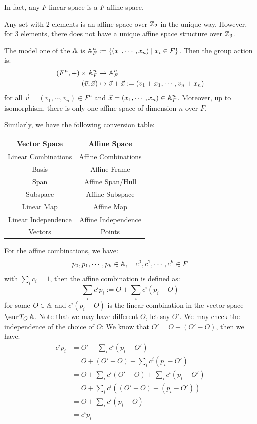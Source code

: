 In fact, any $F$-linear space is a $F$-affine space.

\begin{problem}
Any set with 2 elements is an affine space over $\operatorname{\mathbb{Z}}_2$ in the unique way. However, for 3 elements, there does not have a unique affine space structure over $\operatorname{\mathbb{Z}}_3$.
\end{problem}

The model one of the $\operatorname{\mathbb{A}}$ is $\operatorname{\mathbb{A}}_F^n := \{ (x_1, \cdots, x_n) \mid x_i \in F \}$. Then the group action is:
\begin{align*}
	(F^n, +) \times \operatorname{\mathbb{A}}_F^n & \to \operatorname{\mathbb{A}}_F^n                                                  \\
	(\vec{v}, \vec{x})     & \mapsto \vec{v} + \vec{x} := (v_1 + x_1, \cdots, v_n + x_n)
\end{align*}
for all $\vec{v} = (v_1, \cdots, v_n) \in F^n$ and $\vec{x} = (x_1, \cdots, x_n) \in \operatorname{\mathbb{A}}_F^n$. Moreover, up to isomorphism, there is only one affine space of dimension $n$ over $F$.

Similarly, we have the following conversion table:

\begin{tabularx}{\textwidth}{C C}
	\toprule
	\bfseries Vector Space & \bfseries Affine Space \\
	\midrule
	Linear Combinations    & Affine Combinations    \\
	Basis                  & Affine Frame           \\
	Span                   & Affine Span/Hull       \\
	Subspace               & Affine Subspace        \\
	Linear Map             & Affine Map             \\
	Linear Independence    & Affine Independence    \\
	Vectors                & Points                 \\
	\bottomrule
\end{tabularx}

For the affine combinations, we have:
\[
	p_0, p_1, \cdots, p_k \in \operatorname{\mathbb{A}}, \quad c^0, c^1, \cdots, c^k \in F
\]
with $\sum_i c_i = 1$, then the affine combination is defined as:
\[
	\sum_i c^i p_i := O + \sum_i c^i (p_i - O)
\]
for some $O \in \operatorname{\mathbb{A}}$ and $c^i (p_i - O)$ is the linear combination in the vector space $\mathcal{T}_O \A$. Note that we may have different $O$, let say $O'$. We may check the independence of the choice of $O$: We know that $O' = O + (O' - O)$, then we have:
\begin{align*}
	c^i p_i & = O' + \sum_i c^i (p_i - O')                      \\
	        & = O + (O' - O) + \sum_i c^i (p_i - O')            \\
	        & = O + \sum_i c^i (O' - O) + \sum_i c^i (p_i - O') \\
	        & = O + \sum_i c^i ((O' - O) + (p_i - O'))          \\
	        & = O + \sum_i c^i (p_i - O)                        \\
	        & = c^i p_i
\end{align*}

